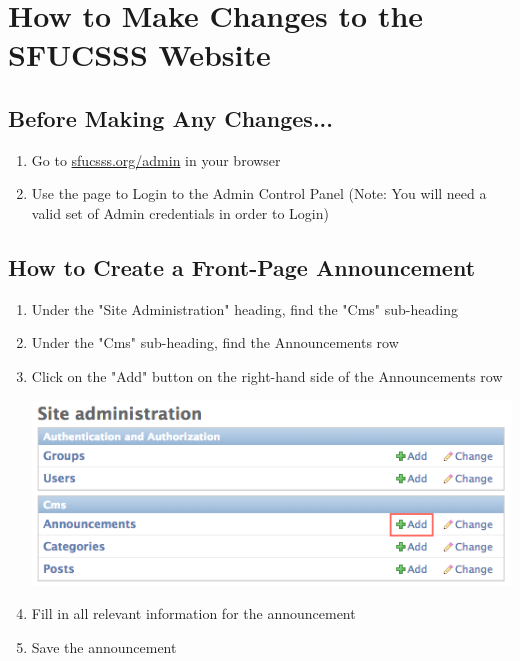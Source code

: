 \documentclass{article}
\begin{document}
\section*{How to Make Changes to the SFUCSSS Website}

\subsection*{Before Making Any Changes...}
\begin{enumerate}
	\item Go to \url{sfucsss.org/admin} in your browser
	\item Use the page to Login to the Admin Control Panel (Note: You will need a valid set of Admin credentials in order to Login)
	
\end{enumerate}

\subsection*{How to Create a Front-Page Announcement}
\begin{enumerate}
	\item Under the "Site Administration" heading, find the "Cms" sub-heading
	\item Under the "Cms" sub-heading, find the Announcements row
	\item Click on the "Add" button on the right-hand side of the Announcements row
	
	\includegraphics[scale=0.45]{Announcements-picture1.png}
	
	\item Fill in all relevant information for the announcement
	\item Save the announcement
	
\end{enumerate}
\end{document}
